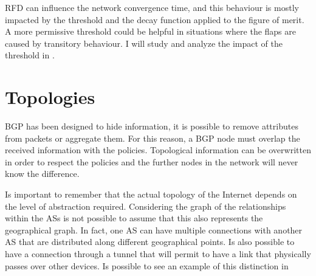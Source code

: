 \ac{RFD} can influence the network convergence time, and this behaviour is
mostly impacted by the threshold and the decay function applied to the figure
of merit.
A more permissive threshold could be helpful in situations where the flaps are
caused by transitory behaviour.
I will study and analyze the impact of the threshold in .


\section{Topologies}
\label{sec:topologies}

\ac{BGP} has been designed to hide information, it is possible to remove attributes
from packets or aggregate them.
For this reason, a \ac{BGP} node must overlap the received information with the
policies.
Topological information can be overwritten in order to respect the policies and
the further nodes in the network will never know the difference.

Is important to remember that the actual topology of the Internet depends on the
level of abstraction required.
Considering the graph of the relationships within the \acp{AS} is not
possible to assume that this also represents the geographical graph.
In fact, one \ac{AS} can have multiple connections with another \ac{AS}
that are distributed along different geographical points.
Is also possible to have a connection through a tunnel that will permit to have
a link that physically passes over other devices.
Is possible to see an example of this distinction in 

